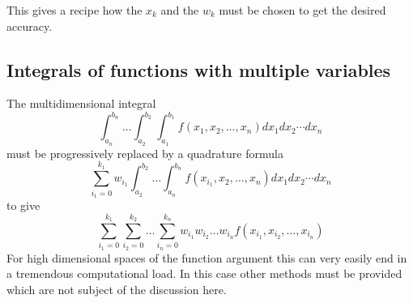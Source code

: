 This gives a recipe how the $x_k$ and the $w_k$ must be chosen to get the
desired accuracy.
\subsection{Integrals of functions with multiple variables}
The multidimensional integral
\[ \int_{a_n}^{b_n}\ldots\int_{a_2}^{b_2}
\int_{a_1}^{b_1}f(x_1,x_2,\ldots,x_n)dx_1dx_2\cdots dx_n\]
must be progressively replaced by a quadrature formula
\[ \sum_{i_1=0}^{k_1}w_{i_1}\int_{a_2}^{b_2}\ldots
\int_{a_n}^{b_n}f(x_{i_1},x_2,\ldots,x_n)dx_1dx_2\cdots dx_n\]
to give
\[ \sum_{i_1=0}^{k_1}\sum_{i_2=0}^{k_2}\ldots
\sum_{i_n=0}^{k_n} w_{i_1} w_{i_2}\ldots w_{i_n}
f(x_{i_1},x_ {i_2},\ldots,x_ {i_n})\]
For high dimensional spaces of the function argument this can very easily end
in a tremendous computational load. In this case other methods must be provided
which are not subject of the discussion here.
